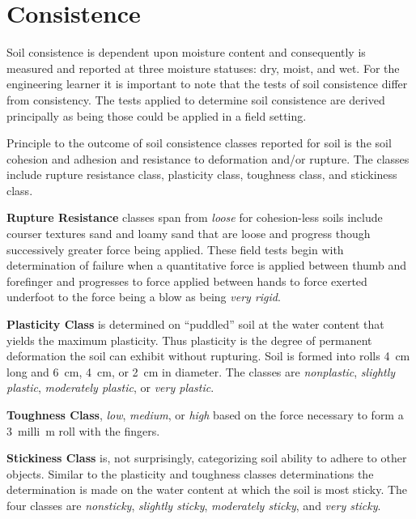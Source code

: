 \documentclass[letterpaper, 12pt]{article}
\begin{document}
\section{Consistence}
\label{consistence}

Soil consistence is dependent upon moisture content and consequently is measured and reported at three moisture statuses: dry, moist, and wet. For the engineering learner it is important to note that the tests of soil consistence differ from consistency. The tests applied to determine soil consistence are derived principally as being those could be applied in a field setting.

Principle to the outcome of soil consistence classes reported for soil is the soil cohesion and adhesion and resistance to deformation and/or rupture. The classes include rupture resistance class, plasticity class, toughness class, and stickiness class.

\textbf{Rupture Resistance} classes span from \textit{loose} for cohesion-less soils include courser textures sand and loamy sand that are loose and progress though successively greater force being applied. These field tests begin with determination of failure when a quantitative force is applied between thumb and forefinger and progresses to force applied between hands to force exerted underfoot to the force being a blow as being \textit{very rigid}.

\textbf{Plasticity Class} is determined on \enquote{puddled} soil at the water content that yields the maximum plasticity. Thus plasticity is the degree of permanent deformation the soil can exhibit without rupturing. Soil is formed into rolls \qty{4}{cm} long and \qty{6}{cm}, \qty{4}{cm}, or \qty{2}{cm} in diameter. The classes are \textit{nonplastic}, \textit{slightly plastic}, \textit{moderately plastic}, or \textit{very plastic}.

\textbf{Toughness Class}, \textit{low},  \textit{medium}, or \textit{high} based on the force necessary to form a \qty{3}{milli\metre} roll with the fingers.

 \textbf{Stickiness Class} is, not surprisingly, categorizing soil ability to adhere to other objects. Similar to the plasticity and toughness classes determinations the determination is made on the water content at which the soil is most sticky. The four classes are \textit{nonsticky}, \textit{slightly sticky}, \textit{moderately sticky}, and \textit{very sticky}.
 
 
\end{document}
